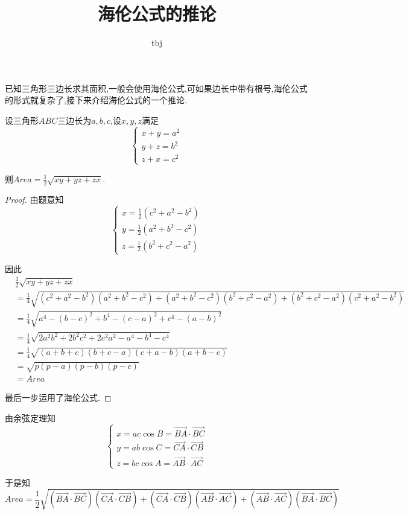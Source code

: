 \documentclass{article}
\title{海伦公式的推论}
\author{tbj}
\date{}
\begin{document}
\maketitle

已知三角形三边长求其面积,一般会使用海伦公式,可如果边长中带有根号,海伦公式的形式就复杂了,接下来介绍海伦公式的一个推论.

\begin{thm}
    设三角形$ABC$三边长为$a, b, c$,设$x, y, z$满足
    \[ \begin{cases}
        x + y = a^2 \\
        y + z = b^2 \\
        z + x = c^2
    \end{cases} \]

    则$Area = \frac{1}{2} \sqrt{xy + yz + zx}$.
\end{thm}

\begin{proof}
    由题意知
    \[ \begin{cases}
        x = \frac{1}{2}(c^2 + a^2 - b^2) \\
        y = \frac{1}{2}(a^2 + b^2 - c^2) \\
        z = \frac{1}{2}(b^2 + c^2 - a^2)
    \end{cases} \]

    因此
    \begin{align*}
        & \frac{1}{2} \sqrt{xy + yz + zx} \\
        & = \frac{1}{4} \sqrt{(c^2 + a^2 - b^2)(a^2 + b^2 - c^2) + (a^2 + b^2 - c^2)(b^2 + c^2 - a^2) +
            (b^2 + c^2 - a^2)(c^2 + a^2 - b^2)} \\
        & = \frac{1}{4} \sqrt{a^4 - (b - c)^2 + b^4 - (c - a)^2 + c^4 - (a - b)^2} \\
        & = \frac{1}{4} \sqrt{2a^2b^2 + 2b^2c^2 + 2c^2a^2 - a^4 - b^4 - c^4} \\
        & = \frac{1}{4} \sqrt{(a + b + c)(b + c - a)(c + a - b)(a + b - c)} \\
        & = \sqrt{p(p - a)(p - b)(p - c)} \\
        & = Area
    \end{align*}

    最后一步运用了海伦公式.
\end{proof}

\begin{rqq}
    由余弦定理知
    \[ \begin{cases}
        x = ac \cos B = \vec{BA} \cdot \vec{BC} \\
        y = ab \cos C = \vec{CA} \cdot \vec{CB} \\
        z = bc \cos A = \vec{AB} \cdot \vec{AC}
    \end{cases} \]

    于是知
    \[ Area = \frac{1}{2} \sqrt{(\vec{BA} \cdot \vec{BC})(\vec{CA} \cdot \vec{CB})
    + (\vec{CA} \cdot \vec{CB})(\vec{AB} \cdot \vec{AC}) + (\vec{AB} \cdot \vec{AC})(\vec{BA} \cdot \vec{BC})} \]
\end{rqq}
\end{document}
